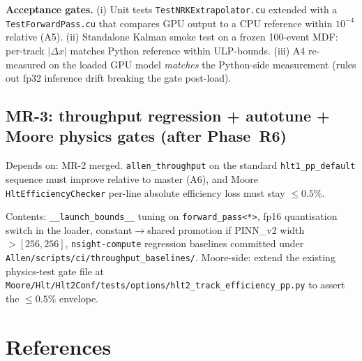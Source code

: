 \documentclass[11pt,a4paper]{article}
\newcommand{\code}[1]{\texttt{#1}}
\begin{document}
\textbf{Acceptance gates.}
(i) Unit tests \code{TestNRKExtrapolator.cu} extended with a
\code{TestForwardPass.cu} that compares GPU output to a CPU reference
within $10^{-4}$ relative (A5).
(ii) Standalone Kalman smoke test on a frozen 100-event MDF: per-track
$|\Delta x|$ matches Python reference within ULP-bounds.
(iii) A4 re-measured on the loaded GPU model
\emph{matches} the Python-side measurement (rules out fp32 inference
drift breaking the gate post-load).

\subsection{MR-3: throughput regression + autotune + Moore physics gates (after Phase~R6)}

Depends on: MR-2 merged. \code{allen\_throughput} on the standard
\code{hlt1\_pp\_default} sequence must improve relative to master (A6),
and Moore \code{HltEfficiencyChecker} per-line absolute efficiency loss
must stay $\le 0.5\%$.

Contents: \code{\_\_launch\_bounds\_\_} tuning on
\code{forward\_pass<*>}, fp16 quantisation switch in the loader,
constant$\to$shared promotion if PINN\_v2 width $> [256,256]$,
\code{nsight-compute} regression baselines committed under
\code{Allen/scripts/ci/throughput\_baselines/}.
Moore-side: extend the existing physics-test gate file at
\code{Moore/Hlt/Hlt2Conf/tests/options/hlt2\_track\_efficiency\_pp.py}
to assert the $\le 0.5\%$ envelope.

\section*{References}
\end{document}
